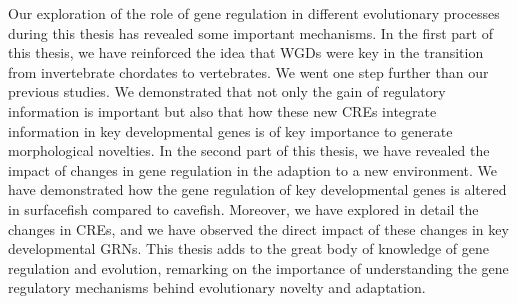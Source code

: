 Our exploration of the role of gene regulation in different evolutionary processes during this thesis has revealed some important mechanisms. In the first part of this thesis, we have reinforced the idea that WGDs were key in the transition from invertebrate chordates to vertebrates. We went one step further than our previous studies. We demonstrated that not only the gain of regulatory information is important but also that how these new CREs integrate information in key developmental genes is of key importance to generate morphological novelties. In the second part of this thesis, we have revealed the impact of changes in gene regulation in the adaption to a new environment. We have demonstrated how the gene regulation of key developmental genes is altered in surfacefish compared to cavefish. Moreover, we have explored in detail the changes in CREs, and we have observed the direct impact of these changes in key developmental GRNs. This thesis adds to the great body of knowledge of gene regulation and evolution, remarking on the importance of understanding the gene regulatory mechanisms behind evolutionary novelty and adaptation.





